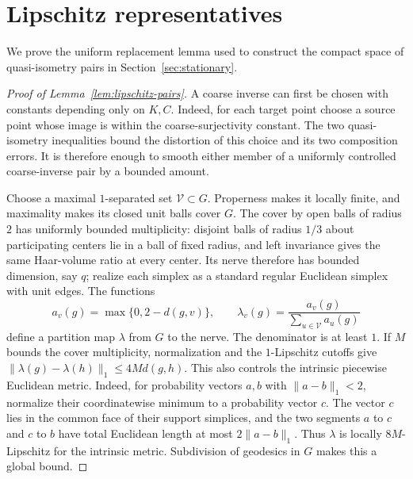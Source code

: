 \section{Lipschitz representatives}
\label{app:lipschitz-representatives}

We prove the uniform replacement lemma used to construct the compact
space of quasi-isometry pairs in Section~\ref{sec:stationary}.

\begin{proof}[Proof of Lemma~\ref{lem:lipschitz-pairs}]
A coarse inverse can first be chosen with constants depending only on
$K,C$.  Indeed, for each target point choose a source point whose image
is within the coarse-surjectivity constant.  The two quasi-isometry
inequalities bound the distortion of this choice and its two composition
errors.  It is therefore enough to smooth either member of a uniformly
controlled coarse-inverse pair by a bounded amount.

Choose a maximal $1$-separated set $\mathcal V\subset G$.
Properness makes it locally finite, and maximality makes its closed
unit balls cover $G$.  The cover by open balls of radius $2$ has uniformly
bounded multiplicity: disjoint balls of radius $1/3$ about participating
centers lie in a ball of fixed radius, and left invariance gives the
same Haar-volume ratio at every center.  Its nerve therefore has bounded
dimension, say $q$; realize each simplex as a standard regular Euclidean
simplex with unit edges.
The functions
\[
 a_v(g)=\max\{0,2-d(g,v)\},\qquad
 \lambda_v(g)=\frac{a_v(g)}{\sum_{u\in\mathcal V}a_u(g)}
\]
define a partition map $\lambda$ from $G$ to the nerve.  The denominator
is at least $1$.  If $M$ bounds the cover multiplicity, normalization
and the $1$-Lipschitz cutoffs give
$\|\lambda(g)-\lambda(h)\|_1\le4M d(g,h)$.
This also controls the intrinsic piecewise Euclidean metric.  Indeed,
for probability vectors $a,b$ with $\|a-b\|_1<2$, normalize their
coordinatewise minimum to a probability vector $c$.  The vector $c$
lies in the common face of their support simplices, and the two
segments $a$ to $c$ and $c$ to $b$ have total Euclidean length at most
$2\|a-b\|_1$.  Thus $\lambda$ is locally $8M$-Lipschitz for the
intrinsic metric.  Subdivision of geodesics in $G$ makes this a global
bound.


\end{proof}
